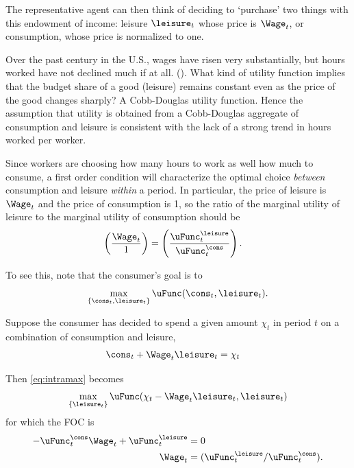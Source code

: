 The representative agent can then think of deciding to `purchase' two things with this
endowment of income: leisure $\leisure_{t}$ whose price is $\Wage_{t}$, or
consumption, whose price is normalized to one.

Over the past century in the U.S., wages have risen very substantially, but hours
worked have not declined much if at all. (\cite{rameyFrancisLeisure}).  What kind of utility
function implies that the budget share of a good
(leisure) remains constant even as the price of the good changes
sharply?  A Cobb-Douglas utility function.  Hence the assumption that
utility is obtained from a Cobb-Douglas aggregate of consumption and
leisure is consistent with the lack of a strong trend in hours worked per
worker.

Since workers are choosing how many hours to work
as well how much to consume, a first order condition
will characterize the optimal choice {\it between} consumption
and leisure {\it within} a period.  In particular, the price of leisure
is $\Wage_{t}$ and the price of consumption is 1, so the ratio of the
marginal utility of leisure to the marginal utility of consumption
should be
\begin{equation}\begin{gathered}\begin{aligned}
        \left(\frac{\Wage_{t}}{1}\right) & =  \left(\frac{\uFunc^{\leisure }_{t}}{\uFunc^{\cons}_{t}}\right). \label{eq:focwucul}
\end{aligned}\end{gathered}\end{equation}

To see this, note that the consumer's goal is to
\begin{equation}
\max_{\{\cons_{t},\leisure_{t}\}} \uFunc(\cons_{t},\leisure_{t})     .
        \label{eq:intramax}
\end{equation}

Suppose the consumer has decided to spend a given amount $\chi_{t}$ in period $t$
on a combination of consumption and leisure,
\begin{equation}\begin{gathered}\begin{aligned}
        \cons_{t}+\Wage_{t}\leisure_{t} & =  \chi_{t}
\end{aligned}\end{gathered}\end{equation}

Then \eqref{eq:intramax} becomes
\begin{equation}
\max_{\{ \leisure_{t} \}} \uFunc(\chi_{t}-\Wage_{t}\leisure_{t},\leisure_{t})
        \label{eq:intramax2}
\end{equation}
for which the FOC is
\begin{equation}\begin{gathered}\begin{aligned}
        - \uFunc^{\cons}_{t}\Wage_{t} + \uFunc_{t}^{\leisure } & =  0
\\      \Wage_{t} & =  (\uFunc^{\leisure }_{t}/\uFunc_{t}^{\cons}).
\end{aligned}\end{gathered}\end{equation}


